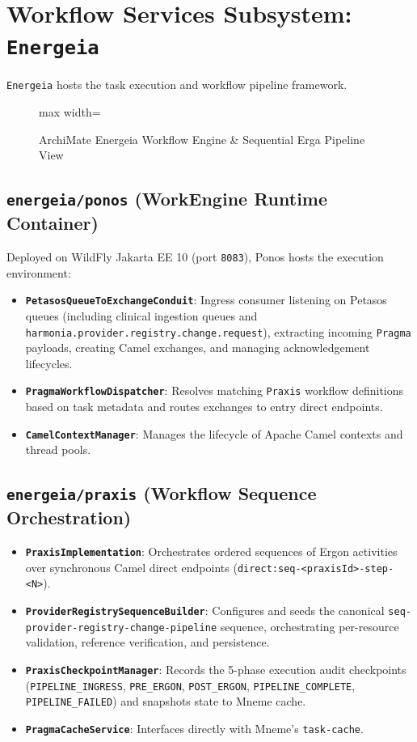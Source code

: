 \section{Workflow Services Subsystem: \texttt{Energeia}}

\texttt{Energeia} hosts the task execution and workflow pipeline framework.

\begin{figure}[htbp]
    \centering
    \begin{adjustbox}{max width=\textwidth}
        
    \end{adjustbox}
    \caption{ArchiMate Energeia Workflow Engine \& Sequential Erga Pipeline View}
    \label{fig:app_layer_energeia_workflow}
\end{figure}

\subsection{\texttt{energeia/ponos} (WorkEngine Runtime Container)}
Deployed on WildFly Jakarta EE 10 (port \texttt{8083}), Ponos hosts the execution environment:
\begin{itemize}
    \item \textbf{\texttt{PetasosQueueToExchangeConduit}}: Ingress consumer listening on Petasos queues (including clinical ingestion queues and \texttt{harmonia.provider.registry.change.request}), extracting incoming \texttt{Pragma} payloads, creating Camel exchanges, and managing acknowledgement lifecycles.
    \item \textbf{\texttt{PragmaWorkflowDispatcher}}: Resolves matching \texttt{Praxis} workflow definitions based on task metadata and routes exchanges to entry direct endpoints.
    \item \textbf{\texttt{CamelContextManager}}: Manages the lifecycle of Apache Camel contexts and thread pools.
\end{itemize}

\subsection{\texttt{energeia/praxis} (Workflow Sequence Orchestration)}
\begin{itemize}
    \item \textbf{\texttt{PraxisImplementation}}: Orchestrates ordered sequences of Ergon activities over synchronous Camel direct endpoints (\texttt{direct:seq-<praxisId>-step-<N>}).
    \item \textbf{\texttt{ProviderRegistrySequenceBuilder}}: Configures and seeds the canonical \texttt{seq-provider-registry-change-pipeline} sequence, orchestrating per-resource validation, reference verification, and persistence.
    \item \textbf{\texttt{PraxisCheckpointManager}}: Records the 5-phase execution audit checkpoints (\texttt{PIPELINE\_INGRESS}, \texttt{PRE\_ERGON}, \texttt{POST\_ERGON}, \texttt{PIPELINE\_COMPLETE}, \texttt{PIPELINE\_FAILED}) and snapshots state to Mneme cache.
    \item \textbf{\texttt{PragmaCacheService}}: Interfaces directly with Mneme's \texttt{task-cache}.
\end{itemize}

